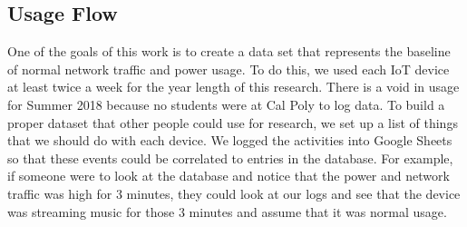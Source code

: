 \begin{table}[H]
    \centering
    \caption{History of IP addresses for each device}
    \label{tab:ipHistory}
\end{table}


\subsection{Usage Flow}

One of the goals of this work is to create a data set that represents the baseline of normal network traffic and power usage. To do this, we used each IoT device at least twice a week for the year length of this research. There is a void in usage for Summer 2018 because no students were at Cal Poly to log data. To build a proper dataset that other people could use for research, we set up a list of things that we should do with each device. We logged the activities into Google Sheets so that these events could be correlated to entries in the database. For example, if someone were to look at the database and notice that the power and network traffic was high for 3 minutes, they could look at our logs and see that the device was streaming music for those 3 minutes and assume that it was normal usage.


